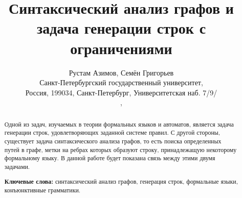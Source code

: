 \documentclass[10pt]{article}
\begin{document}
\title{Синтаксический анализ графов и задача генерации строк с ограничениями}
\author{Рустам Азимов, Семён Григорьев \\ 
Санкт-Петербургский государственный университет, \\
Россия, 199034, Санкт-Петербург, Университетская наб. 7/9/ \\ 
, 
}

\maketitle

\begin{abstract}
Одной из задач, изучаемых в теории формальных языков и автоматов, является задача генерации строк, удовлетворяющих заданной системе правил. С другой стороны, существует задача синтаксического анализа графов, то есть поиска определенных путей в графе, метки на ребрах которых образуют строку, принадлежащую некоторому формальному языку. В данной работе будет показана связь между этими двумя задачами.

\vspace{1em}
\textbf{Ключевые слова:} синтаксический анализ графов, генерация строк, формальные языки, конъюнктивные грамматики.

\end{abstract}







\setmonofont[Mapping=tex-text]{CMU Typewriter Text}


\end{document}
